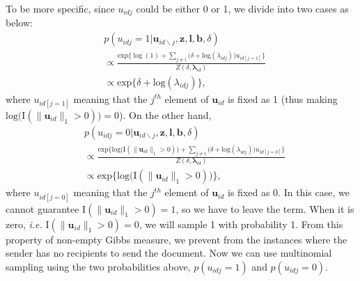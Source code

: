 \documentclass[twoside]{article}
\begin{document}
  	  To be more specific, since $u_{idj}$ could be either 0 or 1, we divide into two cases as below:
  	  \begin{equation*}
  	  \begin{aligned}
  	  &p(u_{idj}=1| \boldsymbol{u}_{id\backslash j}, \boldsymbol{z},\boldsymbol{l},\boldsymbol{b}, \delta)\\& \propto \frac{\mbox{exp}\Big\{\log(1) +\sum\limits_{j \neq i } \Big(\delta+\mbox{log}(\lambda_{idj})\Big){u}_{id[j=1]}\Big\}}{Z(\delta,\boldsymbol{\lambda}_{id})}  
  	  \\& \propto \mbox{exp}\Big\{\delta+\mbox{log}(\lambda_{idj})\Big\},
  	  \end{aligned}\label{eqn:uidj1}
  	  \end{equation*}
  	  where ${u}_{id[j=1]}$ meaning that the $j^{th}$ element of $\boldsymbol{u}_{id}$ is fixed as 1 (thus making $\mbox{log}\big(\text{I}(\lVert\boldsymbol{u}_{id}\rVert_1 > 0 )\big) = 0$). On the other hand, 
  	  \begin{equation*}
  	  \begin{aligned}
  	  &p(u_{idj}=0| \boldsymbol{u}_{id\backslash j}, \boldsymbol{z},\boldsymbol{l},\boldsymbol{b}, \delta)\\& \propto \frac{ \mbox{exp}\Big\{\mbox{log}\big(\text{I}(\lVert\boldsymbol{u}_{id}\rVert_1 > 0 )\big) +\sum\limits_{j \neq i } \Big(\delta+\mbox{log}(\lambda_{idj})\Big){u}_{id[j=0]}\Big\} }{Z(\delta,\boldsymbol{\lambda}_{id})}
  	  \\& \propto \mbox{exp}\Big\{\mbox{log}\big(\text{I}(\lVert\boldsymbol{u}_{id}\rVert_1 > 0 )\big) \Big\},
  	  \end{aligned}\label{eqn:uidj0}
  	  \end{equation*}  
  	  where ${u}_{id[j=0]}$ meaning that the $j^{th}$ element of $\boldsymbol{u}_{id}$ is fixed as 0. In this case, we cannot guarantee $\text{I}(\lVert\boldsymbol{u}_{id}\rVert_1 > 0 )= 1$, so we have to leave the term. When it is zero, \textit{i.e.} $\text{I}(\lVert\boldsymbol{u}_{id}\rVert_1 > 0 )= 0$, we will sample 1 with probability 1. From this property of non-empty Gibbs measure, we prevent from the instances where the sender has no recipients to send the document. Now we can use multinomial sampling using the two probabilities above, $p(u_{idj}=1)$ and $p(u_{idj}=0)$.
  	  
\end{document}
